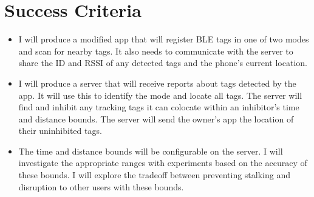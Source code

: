 \documentclass{article}
\begin{document}
\section{Success Criteria}
\begin{itemize}
\item{I will produce a modified app that will register BLE tags in one of two modes and scan for nearby tags. It also needs to communicate with the server to share the ID and RSSI of any detected tags and the phone's current location.}

\item{I will produce a server that will receive reports about tags detected by the app. It will use this to identify the mode and locate all tags. The server will find and inhibit any tracking tags it can colocate within an inhibitor's time and distance bounds. The server will send the owner's app the location of their uninhibited tags. }

\item{The time and distance bounds will be configurable on the server. I will investigate the appropriate ranges with experiments based on the accuracy of these bounds. I will explore the tradeoff between preventing stalking and disruption to other users with these bounds.}

\end{itemize}
\end{document}
